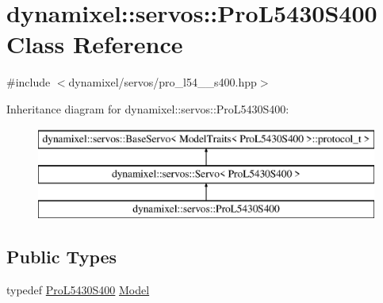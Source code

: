 \hypertarget{classdynamixel_1_1servos_1_1_pro_l5430_s400}{}\section{dynamixel\+:\+:servos\+:\+:Pro\+L5430\+S400 Class Reference}
\label{classdynamixel_1_1servos_1_1_pro_l5430_s400}


{\ttfamily \#include $<$dynamixel/servos/pro\+\_\+l54\+\_\+\_\+s400.\+hpp$>$}

Inheritance diagram for dynamixel\+:\+:servos\+:\+:Pro\+L5430\+S400\+:\begin{figure}[H]
\begin{center}
\leavevmode
\includegraphics[height=3.000000cm]{classdynamixel_1_1servos_1_1_pro_l5430_s400}
\end{center}
\end{figure}
\subsection*{Public Types}
\begin{DoxyCompactItemize}
\item 
typedef \hyperlink{classdynamixel_1_1servos_1_1_pro_l5430_s400}{Pro\+L5430\+S400} \hyperlink{classdynamixel_1_1servos_1_1_pro_l5430_s400_a8bf1bf660eaa3890744bc5953fd18bb7}{Model}
\end{DoxyCompactItemize}
